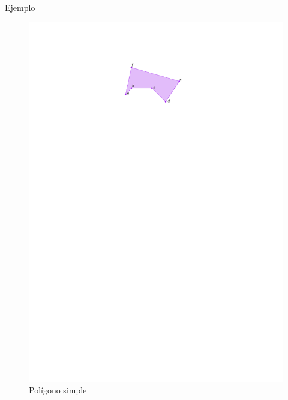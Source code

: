 \documentclass[aspectratio=169,xcolor=dvipsnames, t]{beamer}
\begin{document}
\begin{frame}{Ejemplo}
  \begin{figure}
    \centering
    \includegraphics[width=\linewidth, height=0.5\textheight, page=1, keepaspectratio]{IPE/Melkman.pdf}
    \caption{Polígono simple}
  \end{figure}
\end{frame}
\end{document}
